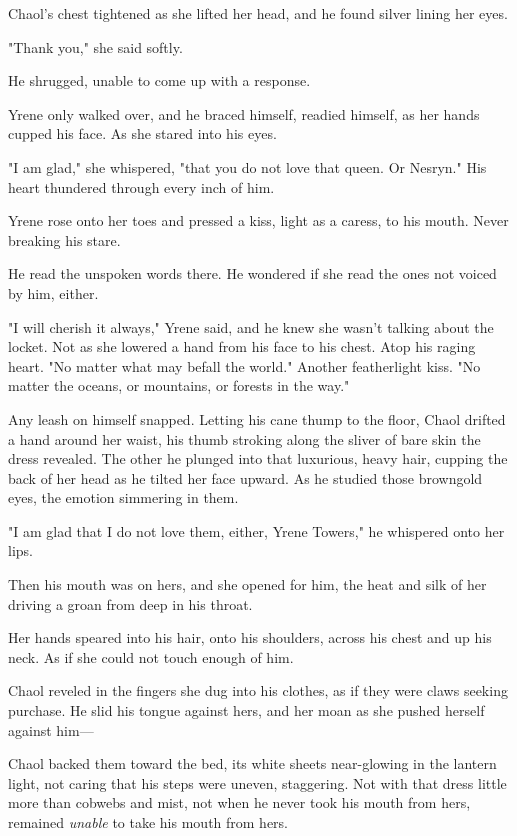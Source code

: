 Chaol's chest tightened as she lifted her head, and he found silver lining her eyes.

"Thank you," she said softly.

He shrugged, unable to come up with a response.

Yrene only walked over, and he braced himself, readied himself, as her hands cupped his face.
As she stared into his eyes.

"I am glad," she whispered, "that you do not love that queen.
Or Nesryn."
His heart thundered through every inch of him.

Yrene rose onto her toes and pressed a kiss, light as a caress, to his mouth.
Never breaking his stare.

He read the unspoken words there.
He wondered if she read the ones not voiced by him, either.

"I will cherish it always," Yrene said, and he knew she wasn't talking about the locket.
Not as she lowered a hand from his face to his chest.
Atop his raging heart.
"No matter what may befall the world."
Another featherlight kiss.
"No matter the oceans, or mountains, or forests in the way."

Any leash on himself snapped.
Letting his cane thump to the floor, Chaol drifted a hand around her waist, his thumb stroking along the sliver of bare skin the dress revealed.
The other he plunged into that luxurious, heavy hair, cupping the back of her head as he tilted her face upward.
As he studied those browngold eyes, the emotion simmering in them.

"I am glad that I do not love them, either, Yrene Towers," he whispered onto her lips.

Then his mouth was on hers, and she opened for him, the heat and silk of her driving a groan from deep in his throat.

Her hands speared into his hair, onto his shoulders, across his chest and up his neck.
As if she could not touch enough of him.

Chaol reveled in the fingers she dug into his clothes, as if they were claws seeking purchase.
He slid his tongue against hers, and her moan as she pushed herself against him---

Chaol backed them toward the bed, its white sheets near-glowing in the lantern light, not caring that his steps were uneven, staggering.
Not with that dress little more than cobwebs and mist, not when he never took his mouth from hers, remained \emph{unable} to take his mouth from hers.

